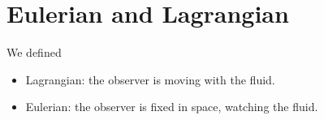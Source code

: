 \section{Eulerian and Lagrangian}

We defined

\begin{itemize}
\item Lagrangian: the observer is moving with the fluid.
\item Eulerian: the observer is fixed in space, watching the fluid.
\end{itemize}
